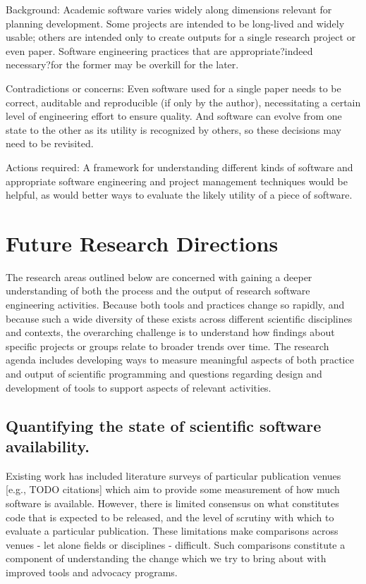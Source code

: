 \documentclass[a4paper,UKenglish]{dagman}
\begin{document}
Background: Academic software varies widely along dimensions relevant for planning development. Some projects are intended to be long-lived and widely usable; others are intended only to create outputs for a single research project or even paper. Software engineering practices that are appropriate?indeed necessary?for the former may be overkill for the later. 

Contradictions or concerns: Even software used for a single paper needs to be correct, auditable and reproducible (if only by the author), necessitating a certain level of engineering effort to ensure quality. And software can evolve from one state to the other as its utility is recognized by others, so these decisions may need to be revisited. 

Actions required: A framework for understanding different kinds of software and appropriate software engineering and project management techniques would be helpful, as would better ways to evaluate the likely utility of a piece of software. 



\section{Future Research Directions}

The research areas outlined below are concerned with gaining a deeper understanding of both the process and the output of research software engineering activities. Because both tools and practices change so rapidly, and because such a wide diversity of these exists across different scientific disciplines and contexts, the overarching challenge is to understand how findings about specific projects or groups relate to broader trends over time. The research agenda includes developing ways to measure meaningful aspects of both practice and output of scientific programming and questions regarding design and development of tools to support aspects of relevant activities.

\subsection{Quantifying the state of scientific software availability.}

Existing work has included literature surveys of particular publication venues [e.g., TODO citations] which aim to provide some measurement of how much software is available. However, there is limited consensus on what constitutes code that is expected to be released, and the level of scrutiny with which to evaluate a particular publication. These limitations make comparisons across venues - let alone fields or disciplines - difficult. Such comparisons constitute a component of understanding the change which we try to bring about with improved tools and advocacy programs. 
\end{document}
